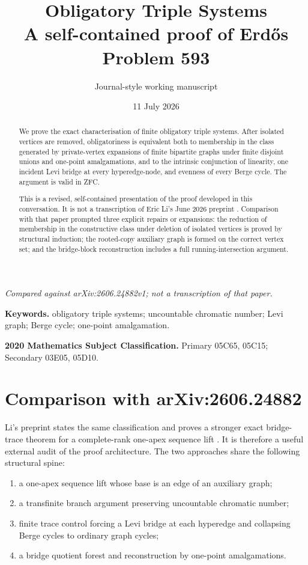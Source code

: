\documentclass[11pt]{article}
\title{\sffamily\bfseries Obligatory Triple Systems\\[0.3em]
\Large A self-contained proof of Erd\H{o}s Problem 593}
\author{Journal-style working manuscript}
\date{11 July 2026}
\newcommand{\tightlist}{\setlength{\itemsep}{0pt}\setlength{\parskip}{0pt}}
\begin{document}
\maketitle
\begin{center}
\small\itshape Compared against arXiv:2606.24882v1; not a transcription of that paper.
\end{center}
\vspace{0.6em}
\begin{abstract}

We prove the exact characterisation of finite obligatory triple systems. After isolated vertices are removed, obligatoriness is equivalent both to membership in the class generated by private-vertex expansions of finite bipartite graphs under finite disjoint unions and one-point amalgamations, and to the intrinsic conjunction of linearity, one incident Levi bridge at every hyperedge-node, and evenness of every Berge cycle. The argument is valid in ZFC.

This is a revised, self-contained presentation of the proof developed in this conversation. It is not a transcription of Eric Li's June 2026 preprint \autocite{li2026}. Comparison with that paper prompted three explicit repairs or expansions: the reduction of membership in the constructive class under deletion of isolated vertices is proved by structural induction; the rooted-copy auxiliary graph is formed on the correct vertex set; and the bridge-block reconstruction includes a full running-intersection argument.

\end{abstract}
\noindent\textbf{Keywords.} obligatory triple systems; uncountable chromatic number; Levi graph; Berge cycle; one-point amalgamation.\par
\noindent\textbf{2020 Mathematics Subject Classification.} Primary 05C65, 05C15; Secondary 03E05, 05D10.
\tableofcontents
\clearpage
\section{Comparison with arXiv:2606.24882}\label{comparison-with-arxiv}

Li's preprint states the same classification and proves a stronger exact bridge-trace theorem for a complete-rank one-apex sequence lift \autocite{li2026}. It is therefore a useful external audit of the proof architecture. The two approaches share the following structural spine:

\begin{enumerate}
\def\labelenumi{\arabic{enumi}.}
\tightlist
\item
  a one-apex sequence lift whose base is an edge of an auxiliary graph;
\item
  a transfinite branch argument preserving uncountable chromatic number;
\item
  finite trace control forcing a Levi bridge at each hyperedge and collapsing Berge cycles to ordinary graph cycles;
\item
  a bridge quotient forest and reconstruction by one-point amalgamations.
\end{enumerate}
\end{document}
